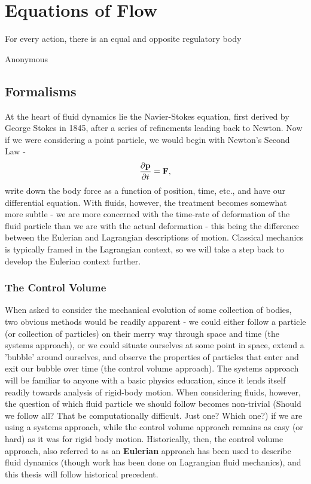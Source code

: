 \chapter{Equations of Flow}
    	 	\epigraph{For every action, there is an equal and opposite regulatory body}{Anonymous}
\section{Formalisms}
At the heart of fluid dynamics lie the Navier-Stokes equation, first derived by George Stokes in 1845, after a series of refinements leading back to Newton. Now if we were considering a point particle, we would begin with Newton's Second Law - 
\begin{equation}
\pder{1}{\Vector{p}}{t} = \Vector{F}, 
\end{equation}
write down the body force as a function of position, time, etc., and have our differential equation. With fluids, however, the treatment becomes somewhat more subtle - we are more concerned with the time-rate of deformation of the fluid particle than we are with the actual deformation - this being the difference between the Eulerian and Lagrangian descriptions of motion. Classical mechanics is typically framed in the Lagrangian context, so we will take a step back to develop the Eulerian context further. 

\subsection{The Control Volume}

When asked to consider the mechanical evolution of some collection of bodies, two obvious methods would be readily apparent - we could either follow a particle (or collection of particles) on their merry way through space and time (the systems approach), or we could situate ourselves at some point in space, extend a 'bubble' around ourselves, and observe the properties of particles that enter and exit our bubble over time (the control volume approach). The systems approach will be familiar to anyone with a basic physics education, since it lends itself readily towards analysis of rigid-body motion. When considering fluids, however, the question of which fluid particle we should follow becomes non-trivial (Should we follow all? That be computationally difficult. Just one? Which one?) if we are using a systems approach, while the control volume approach remains as easy (or hard) as it was for rigid body motion. Historically, then, the control volume approach, also referred to as an {\bf Eulerian} approach has been used to describe fluid dynamics (though work has been done on Lagrangian fluid mechanics), and this thesis will follow historical precedent.  

